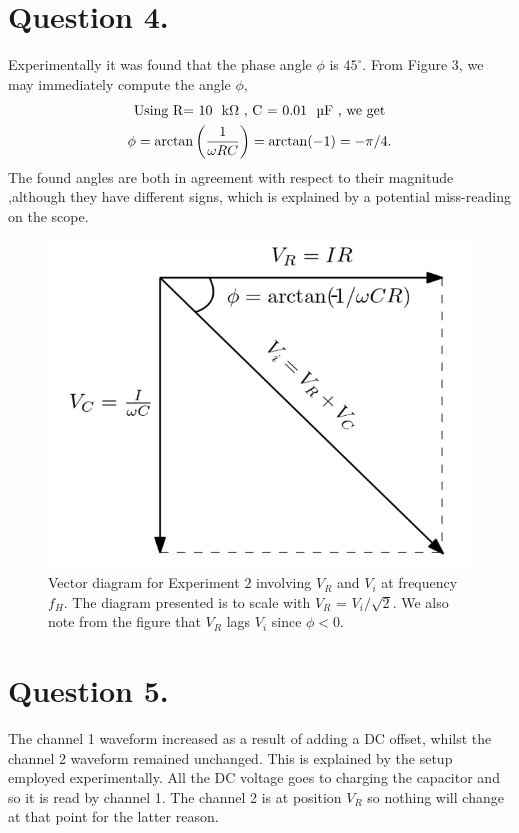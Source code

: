 \documentclass[
	12pt,
	]{article}
\theoremstyle{definition}
\theoremstyle{definition}
\theoremstyle{definition}
\theoremstyle{definition}
\theoremstyle{definition}
\theoremstyle{example}
\theoremstyle{note}
\theoremstyle{remark}
\theoremstyle{example}
\begin{document}
				
				\vspace{0.5cm}
		\section*{Question 4.}
			Experimentally it was found that the phase angle $\phi$ is $45 ^\circ$. 
				From Figure 3, we may immediately compute the angle $\phi$, 
						\begin{gather*}
							\text{Using R= 10 \ \si{\kilo\ohm} , C = 0.01 \ \si{\micro\farad} , we get} \\
							\phi = \arctan \left(\frac{1}{\omega RC}\right) = \arctan(-1) = -\pi/4.
						\end{gather*}
						The found angles are both in agreement with respect to their magnitude ,although  they have different signs, which is explained by a potential miss-reading on the scope.
			\begin{figure}[H]
				\centering
				\includegraphics[width = 0.6\linewidth]{phys241_lab3_picture3.png}
				\captionsetup{margin=1cm}
				\caption{Vector diagram for Experiment $2$ involving $V_{R}$ and $V_{i}$ at frequency $f_{H}$. The diagram presented is to scale with $V_{R}$ = $V_{i}/\sqrt{2}$. We also note from the figure that $V_{R}$ lags $V_{i}$ since $\phi < 0$.}
			\end{figure}
		\section*{Question 5.}
			The channel 1 waveform increased as a result of adding a DC offset, whilst the channel 2 waveform remained unchanged. This is explained by the setup employed experimentally. All the DC voltage goes to charging the capacitor and so it is read by channel 1. The channel 2 is at position $V_{R}$ so nothing will change at that point for the latter reason. 
\end{document}
